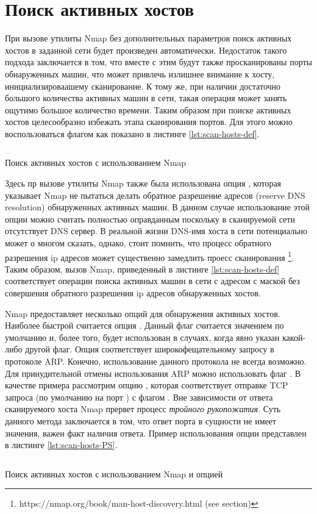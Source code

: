 \section{Поиск активных хостов}

При вызове утилиты Nmap без дополнительных параметров поиск активных хостов в заданной сети будет произведен автоматически. Недостаток
такого подхода заключается в том, что вместе с этим будут также просканированы порты обнаруженных машин, что может привлечь излишнее 
внимание к хосту, инициализироваашему сканирование. К тому же, при наличии достаточно большого количества активных машин в сети, такая
операция может занять ощутимо большое количество времени. Таким образом при поиске активных хостов целесообразно избежать этапа 
сканирования портов. Для этого можно воспользоваться флагом  как показано в листинге \ref{lst:scan-hosts-def}. 

\begin{listing}[H]
    \inputminted{console}{resources/01_scan_hosts_default}
    \caption{Поиск активных хостов с использованием Nmap}
    \label{lst:scan-hosts-def}
\end{listing}

Здесь пр вызове утилиты Nmap также была использована опция , которая указывает Nmap не пытаться делать обратное разрешение 
адресов (reserve DNS resolution) обнаруженных активных машин. В данном случае использование этой опции можно считать полностью 
оправданным поскольку в сканируемой сети отсутствует DNS сервер. В реальной жизни DNS-имя хоста в сети потенциально может о многом
сказать, однако, стоит помнить, что процесс обратного разрешения ip адресов может существенно замедлить проесс сканирования 
\footnote{https://nmap.org/book/man-host-discovery.html (see  section)}. Таким образом, вызов Nmap, приведенный в листинге 
\ref{lst:scan-hosts-def} соответствует операции поиска активных машин в сети с адресом  с маской  без
совершения обратного разрешения ip адресов обнаруженных хостов. 

Nmap предоставляет несколько опций для обнаружения активных хостов. Наиболее быстрой считается опция . Данный флаг считается 
значением по умолчанию и, более того, будет использован в случаях, когда явно указан какой-либо другой флаг. Опция  
соответствует широкофещательному запросу в протоколе ARP. Конечно, использование данного протокола не всегда возможно. Для 
принудительной отмены использования ARP можно использовать флаг . В качестве примера рассмотрим опцию 
, которая соответствует отправке TCP запроса (по умолчанию на порт ) с флагом . Вне зависимости от ответа 
сканируемого хоста Nmap прервет процесс \emph{тройного рукопожатия}. Суть данного метода заключается в том, что ответ порта в сущности
не имеет значения, важен факт наличия ответа. Пример использования опции  представлен в листинге \ref{lst:scan-hosts-PS}.

\begin{listing}[H]
    \inputminted{console}{resources/02_scan_hosts_PS}
    \caption{Поиск активных хостов с использованием Nmap и опцией }
    \label{lst:scan-hosts-PS}
\end{listing}